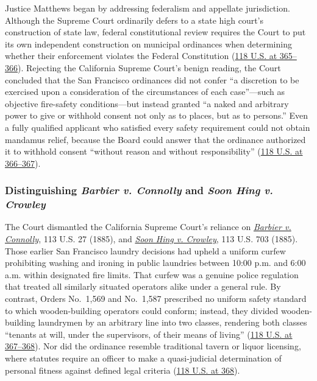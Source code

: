 \documentclass[12pt]{article}
\begin{document}
Justice Matthews began by addressing federalism and appellate jurisdiction. Although the Supreme Court ordinarily defers to a state high court's construction of state law, federal constitutional review requires the Court to put its own independent construction on municipal ordinances when determining whether their enforcement violates the Federal Constitution (\href{https://supreme.justia.com/cases/federal/us/118/356/}{118 U.S. at 365--366}). Rejecting the California Supreme Court's benign reading, the Court concluded that the San Francisco ordinances did not confer ``a discretion to be exercised upon a consideration of the circumstances of each case''---such as objective fire-safety conditions---but instead granted ``a naked and arbitrary power to give or withhold consent not only as to places, but as to persons.'' Even a fully qualified applicant who satisfied every safety requirement could not obtain mandamus relief, because the Board could answer that the ordinance authorized it to withhold consent ``without reason and without responsibility'' (\href{https://supreme.justia.com/cases/federal/us/118/356/}{118 U.S. at 366--367}).

\subsubsection{Distinguishing \emph{Barbier v. Connolly} and \emph{Soon Hing v. Crowley}}

The Court dismantled the California Supreme Court's reliance on \href{https://supreme.justia.com/cases/federal/us/113/27/}{\emph{Barbier v. Connolly}}, 113 U.S. 27 (1885), and \href{https://supreme.justia.com/cases/federal/us/113/703/}{\emph{Soon Hing v. Crowley}}, 113 U.S. 703 (1885). Those earlier San Francisco laundry decisions had upheld a uniform curfew prohibiting washing and ironing in public laundries between 10:00 p.m. and 6:00 a.m. within designated fire limits. That curfew was a genuine police regulation that treated all similarly situated operators alike under a general rule. By contrast, Orders No.~1,569 and No.~1,587 prescribed no uniform safety standard to which wooden-building operators could conform; instead, they divided wooden-building laundrymen by an arbitrary line into two classes, rendering both classes ``tenants at will, under the supervisors, of their means of living'' (\href{https://supreme.justia.com/cases/federal/us/118/356/}{118 U.S. at 367--368}). Nor did the ordinance resemble traditional tavern or liquor licensing, where statutes require an officer to make a quasi-judicial determination of personal fitness against defined legal criteria (\href{https://supreme.justia.com/cases/federal/us/118/356/}{118 U.S. at 368}).
\end{document}
